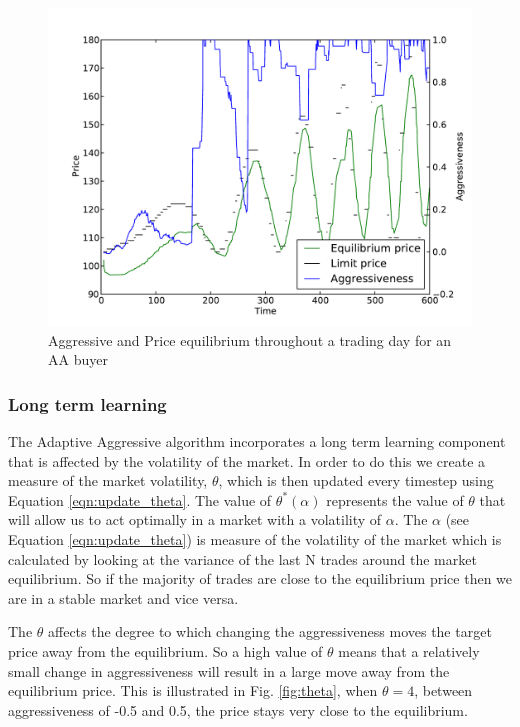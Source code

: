 \documentclass[preprint]{acm_proc_article-sp} %
\begin{document}
\begin{figure} 
\centering
\label{fig:avtime}
\includegraphics[width=\columnwidth]{graphs_and_stats/graph_aggressiveness_vs_price.pdf}
\caption{Aggressive and Price equilibrium throughout a trading day for an AA
buyer}
\end{figure}

\subsubsection{Long term learning} \label{sec:AA_long_term_learning}
The Adaptive Aggressive algorithm incorporates a long term learning component that is
affected by the volatility of the market. In order to do this we create a
measure of the market volatility, $\theta$, which is then updated every
timestep using Equation \ref{eqn:update_theta}. The value of $\theta^*(\alpha)$
represents the value of $\theta$ that will allow us to act optimally in a
market with a volatility of $\alpha$.  The $\alpha$ (see Equation
\ref{eqn:update_theta}) is measure of the volatility of the market which is calculated
by looking at the variance of the last N trades around the market equilibrium.
So if the majority of trades are close to the equilibrium price then we are in
a stable market and vice versa.

The $\theta$ affects the degree to which changing the aggressiveness moves the
target price  away from the equilibrium. So a high value of $\theta$ means that a
relatively small change in aggressiveness will result in a large move away from
the equilibrium price. This is illustrated in Fig. \ref{fig:theta}, when
$\theta=4$, between aggressiveness of -0.5 and 0.5, the price stays very close
to the equilibrium.
\end{document}
